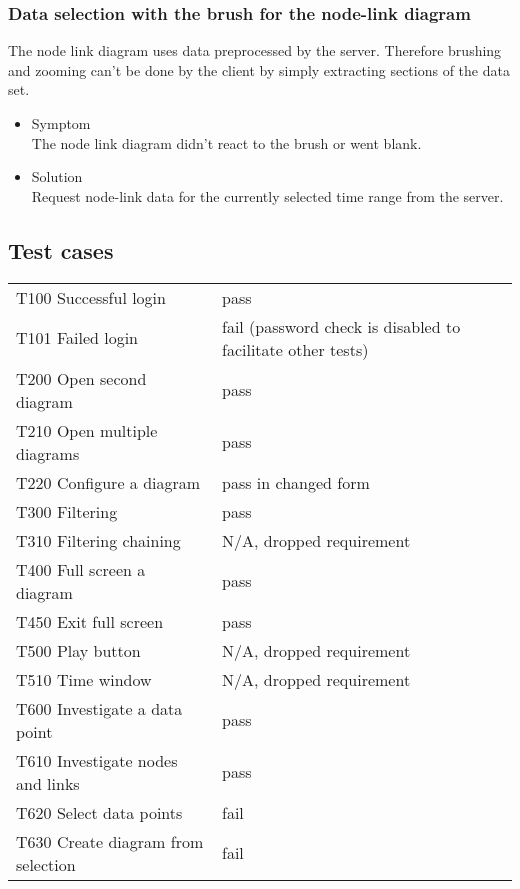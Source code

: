 \documentclass[oneside, english, final]{design}
\begin{document}
\subsubsection{Data selection with the brush for the node-link diagram}

The node link diagram uses data preprocessed by the server. Therefore brushing and zooming can't be done by the client by simply extracting sections of the data set.

\begin{itemize}
      \item{Symptom
            \\
            The node link diagram didn't react to the brush or went blank.
	}
      \item{Solution
            \\
            Request node-link data for the currently selected time range from the server.
            }
\end{itemize}



\newpage

\subsection{Test cases}
\begin{tabular}{l|l}
	T100 Successful login & pass \\
	T101 Failed login & fail (password check is disabled to facilitate other tests) \\
	T200 Open second diagram & pass \\
	T210 Open multiple diagrams & pass \\
	T220 Configure a diagram & pass in changed form \\
	T300 Filtering & pass \\
	T310 Filtering chaining & N/A, dropped requirement \\
	T400 Full screen a diagram & pass \\
	T450 Exit full screen & pass \\
	T500 Play button & N/A, dropped requirement \\
	T510 Time window & N/A, dropped requirement \\
	T600 Investigate a data point & pass \\
	T610 Investigate nodes and links & pass \\
	T620 Select data points & fail \\
	T630 Create diagram from selection & fail \\
\end {tabular}
\end{document}
